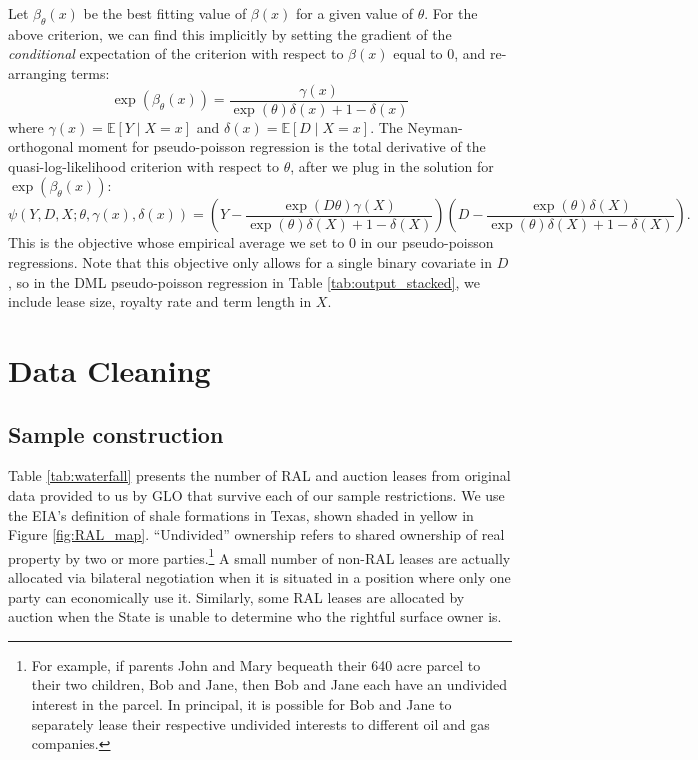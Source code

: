 \documentclass[12pt]{article}
\begin{document}
\begin{appendices}
Let $\beta_{\theta}(x)$ be the best fitting value of $\beta(x)$ for a given value of $\theta$.  For the above criterion, we can find this implicitly by setting the gradient of the \textit{conditional} expectation of the criterion with respect to $\beta(x)$ equal to 0, and re-arranging terms:
\begin{equation*}
	\exp(\beta_{\theta}(x)) = \frac{\gamma(x)}{\exp(\theta)\delta(x) + 1 - \delta(x)}
\end{equation*}	
where $\gamma(x) = \mathbb{E}\left[Y\mid X = x\right]$ and $\delta(x) = \mathbb{E}\left[D\mid X = x\right]$.  The Neyman-orthogonal moment for pseudo-poisson regression is the total derivative of the quasi-log-likelihood criterion with respect to $\theta$, after we plug in the solution for $\exp(\beta_{\theta}(x))$:
\begin{equation*}
	\psi(Y, D, X; \theta, \gamma(x), \delta(x)) = \left(Y-\frac{\exp(D\theta)\gamma(X)}{\exp(\theta)\delta(X) + 1 - \delta(X)}\right)\left(D - \frac{\exp(\theta)\delta(X)}{\exp(\theta)\delta(X) + 1 - \delta(X)}\right).
\end{equation*}
This is the objective whose empirical average we set to 0 in our pseudo-poisson regressions.  Note that this objective only allows for a single binary covariate in $D$, so in the DML pseudo-poisson regression in Table \ref{tab:output_stacked}, we include lease size, royalty rate and term length in $X$.
\section{Data Cleaning \label{sec:DataCleaning}}

\subsection{Sample construction \label{sec:AppendixSampleConstruction}}

Table \ref{tab:waterfall} presents the number of RAL and auction leases from original data provided to us by GLO that survive each of our sample restrictions. We use the EIA's definition of shale formations in Texas, shown shaded in yellow in Figure \ref{fig:RAL_map}. ``Undivided'' ownership refers to shared ownership of real property by two or more parties.\footnote{For example, if parents John and Mary bequeath their 640 acre parcel to their two children, Bob and Jane, then Bob and Jane each have an undivided interest in the parcel.  In principal, it is possible for Bob and Jane to separately lease their respective undivided interests to different oil and gas companies.} A small number of non-RAL leases are actually allocated via bilateral negotiation when it is situated in a position where only one party can economically use it.   Similarly, some RAL leases are allocated by auction when the State is unable to determine who the rightful surface owner is.  


\end{appendices}
\end{document}
